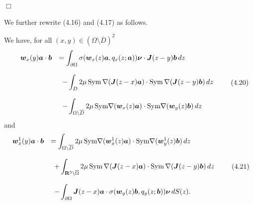 \noindent
$\Box$


We further rewrite (4.16) and (4.17) as follows.




We have, for all $(x,y)\in (\Omega\setminus\overline{D})^2$
$$\begin{array}{ll}
\displaystyle
\,\,\,\,\,\,
\mbox{\boldmath $w$}_x(y)\mbox{\boldmath $a$}\cdot\mbox{\boldmath $b$}
&
\displaystyle
=\int_{\partial\Omega}\sigma(\mbox{\boldmath $w$}_x(z)\mbox{\boldmath $a$},q_x(z;\mbox{\boldmath $a$}))\mbox{\boldmath $\nu$}\cdot
\mbox{\boldmath $J$}(z-y)\mbox{\boldmath $b$}\,dz
\\
\\
\displaystyle
&
\displaystyle
\,\,\,
-\int_D2\mu\,\text{Sym}\,\nabla(\mbox{\boldmath $J$}(z-x)\mbox{\boldmath $a$})
\cdot
\text{Sym}\,\nabla(\mbox{\boldmath $J$}(z-y)\mbox{\boldmath $b$})
\,dz
\\
\\
\displaystyle
&
\displaystyle
\,\,\,
-\int_{\Omega\setminus\overline{D}}2\mu\,\text{Sym}\nabla(\mbox{\boldmath $w$}_x(z)\mbox{\boldmath $a$})
\cdot\text{Sym}\nabla(\mbox{\boldmath $w$}_y(z)\mbox{\boldmath $b$})\,dz
\end{array}
\tag {4.20}
$$
and
$$\begin{array}{ll}
\displaystyle
\mbox{\boldmath $w$}_x^1(y)\mbox{\boldmath $a$}\cdot\mbox{\boldmath $b$}
&
\displaystyle
=\int_{\Omega\setminus\overline{D}}2\mu\,\text{Sym}\nabla(\mbox{\boldmath $w$}_x^1(z)\mbox{\boldmath $a$})
\cdot\text{Sym}\nabla(\mbox{\boldmath $w$}_y^1(z)\mbox{\boldmath $b$})\,dz
\\
\\
\displaystyle
&
\displaystyle
\,\,\,
+
\int_{\Bbb R^3\setminus\overline{\Omega}}
2\mu\,\text{Sym}\,\nabla(\mbox{\boldmath $J$}(z-x)\mbox{\boldmath $a$})
\cdot\text{Sym}\,\nabla(\mbox{\boldmath $J$}(z-y)\mbox{\boldmath $b$})\,dz
\\
\\
\displaystyle
&
\displaystyle
\,\,\,
-\int_{\partial\Omega}\mbox{\boldmath $J$}(z-x)\mbox{\boldmath $a$}
\cdot\sigma(\mbox{\boldmath $w$}_y(z)\mbox{\boldmath $b$},q_y(z;\mbox{\boldmath $b$}))
\mbox{\boldmath $\nu$}\,dS(z).
\end{array}
\tag {4.21}
$$

\endproclaim



